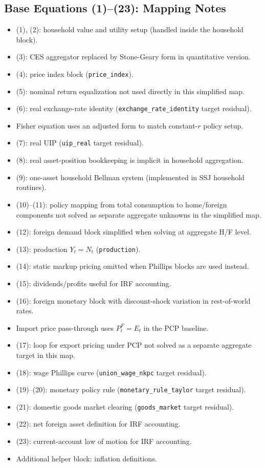 \documentclass[12pt]{article}
\begin{document}
\subsection{Base Equations (1)--(23): Mapping Notes}
\begin{itemize}
  \item (1), (2): household value and utility setup (handled inside the household block).
  \item (3): CES aggregator replaced by Stone-Geary form in quantitative version.
  \item (4): price index block (\texttt{price\_index}).
  \item (5): nominal return equalization not used directly in this simplified map.
  \item (6): real exchange-rate identity (\texttt{exchange\_rate\_identity} target residual).
  \item Fisher equation uses an adjusted form to match constant-$r$ policy setup.
  \item (7): real UIP (\texttt{uip\_real} target residual).
  \item (8): real asset-position bookkeeping is implicit in household aggregation.
  \item (9): one-asset household Bellman system (implemented in SSJ household routines).
  \item (10)--(11): policy mapping from total consumption to home/foreign components not solved as separate aggregate unknowns in the simplified map.
  \item (12): foreign demand block simplified when solving at aggregate H/F level.
  \item (13): production $Y_t=N_t$ (\texttt{production}).
  \item (14): static markup pricing omitted when Phillips blocks are used instead.
  \item (15): dividends/profits useful for IRF accounting.
  \item (16): foreign monetary block with discount-shock variation in rest-of-world rates.
  \item Import price pass-through uses $P^F_t=E_t$ in the PCP baseline.
  \item (17): loop for export pricing under PCP not solved as a separate aggregate target in this map.
  \item (18): wage Phillips curve (\texttt{union\_wage\_nkpc} target residual).
  \item (19)--(20): monetary policy rule (\texttt{monetary\_rule\_taylor} target residual).
  \item (21): domestic goods market clearing (\texttt{goods\_market} target residual).
  \item (22): net foreign asset definition for IRF accounting.
  \item (23): current-account law of motion for IRF accounting.
  \item Additional helper block: inflation definitions.
\end{itemize}
\end{document}
